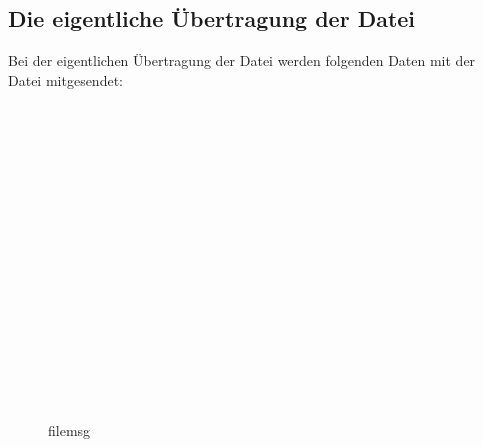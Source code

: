 \subsection{Die eigentliche Übertragung der Datei}
Bei der eigentlichen Übertragung der Datei werden folgenden Daten mit der Datei mitgesendet: 
\begin{figure}[H]
\begin{centering}

\begin{bytefield}[bitwidth=3em]{8}
	\\
	 \\
	
	\begin{rightwordgroup}{\isprotomsgtype}
	\end{rightwordgroup} \\
	
	\begin{rightwordgroup}{\isprotomsgdata}
		 \\
		\skippedwords \\
		 \\
		 \\
		\skippedwords \\
		 \\
		 \\
		\skippedwords \\
		 \\
		 \\
		\skippedwords \\
	\end{rightwordgroup}
	
\end{bytefield}
\par\end{centering}
\protect\caption{\gls{filemsg}}
\end{figure}

